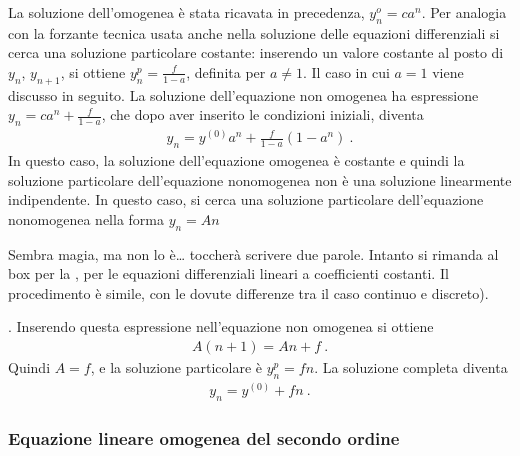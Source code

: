\documentclass[letterpaper,10pt,italian]{jupyterBook}
\begin{document}
\sphinxAtStartPar
La soluzione dell’omogenea è stata ricavata in precedenza, \(y^o_n = c a^n\). Per analogia con la forzante \sphinxhyphen{} tecnica usata anche nella soluzione delle equazioni differenziali \sphinxhyphen{} si cerca una soluzione particolare costante: inserendo un valore costante al posto di \(y_n\), \(y_{n+1}\), si ottiene \(y^p_n = \frac{f}{1-a}\), definita per \(a \ne 1\). Il caso in cui \(a = 1\) viene discusso in seguito. La soluzione dell’equazione non omogenea ha espressione \(y_n = c a^n + \frac{f}{1-a}\), che dopo aver inserito le condizioni iniziali, diventa
\begin{equation*}
\begin{split}y_n = y^{(0)} a^n + \frac{f}{1-a} \left( 1 -  a^n \right) \ .\end{split}
\end{equation*}
\sphinxAtStartPar
{} In questo caso, la soluzione dell’equazione omogenea è costante e quindi la soluzione particolare dell’equazione non\sphinxhyphen{}omogenea non è una soluzione linearmente indipendente. In questo caso, si cerca una soluzione particolare dell’equazione non\sphinxhyphen{}omogenea nella forma \(y_n = A n\)%
\begin{footnote}[1]\sphinxAtStartFootnote
Sembra magia, ma non lo è… toccherà scrivere due parole. Intanto si rimanda al box  per la {\hyperref[\detokenize{ch/ode:ode-hs-types-linear-const-sol-homo}]{}}, per le equazioni differenziali lineari a coefficienti costanti. Il procedimento è simile, con le dovute differenze tra il caso continuo e discreto).
%
\end{footnote}. Inserendo questa espressione nell’equazione non omogenea si ottiene
\begin{equation*}
\begin{split}A ( n + 1 ) = A n + f \ .\end{split}
\end{equation*}
\sphinxAtStartPar
Quindi \(A = f\), e la soluzione particolare è \(y^{p}_n = f n\). La soluzione completa diventa
\begin{equation*}
\begin{split}y_{n} = y^{(0)} + f n \ .\end{split}
\end{equation*}\subsubsection*{Equazione lineare omogenea del secondo ordine}
\end{document}
